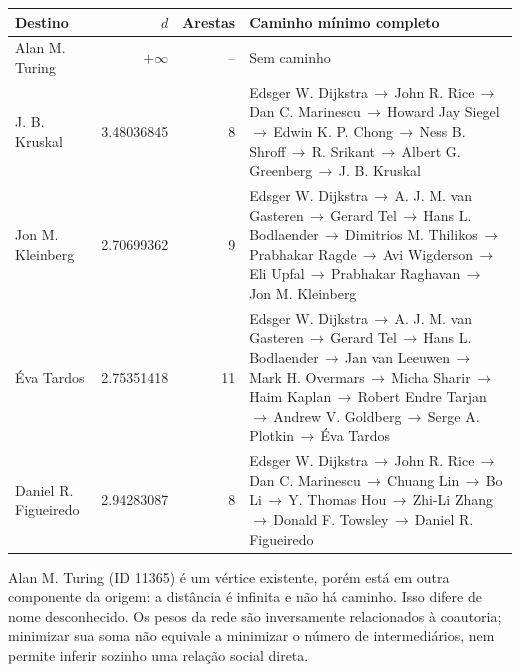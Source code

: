 \documentclass[a4paper,11pt]{article}
\newcommand{\rota}[1]{{\fontsize{8.5}{10.2}\selectfont #1}}
\begin{document}
\par\smallskip\noindent\begin{minipage}{\textwidth}\centering
\begingroup\fontsize{8.7}{10.4}\selectfont
\setlength{\tabcolsep}{4pt}
\begin{tabular}{>{\raggedright\arraybackslash}p{2.6cm} r r >{\raggedright\arraybackslash}p{10.2cm}}
\toprule
Destino & $d$ & Arestas & Caminho mínimo completo \\
\midrule
Alan M. Turing & $+\infty$ & -- & Sem caminho \\
J. B. Kruskal & \num{3.48036845} & 8 & \rota{Edsger W. Dijkstra\,$\to$\,\allowbreak John R. Rice\,$\to$\,\allowbreak Dan C. Marinescu\,$\to$\,\allowbreak Howard Jay Siegel\,$\to$\,\allowbreak Edwin K. P. Chong\,$\to$\,\allowbreak Ness B. Shroff\,$\to$\,\allowbreak R. Srikant\,$\to$\,\allowbreak Albert G. Greenberg\,$\to$\,\allowbreak J. B. Kruskal} \\
Jon M. Kleinberg & \num{2.70699362} & 9 & \rota{Edsger W. Dijkstra\,$\to$\,\allowbreak A. J. M. van Gasteren\,$\to$\,\allowbreak Gerard Tel\,$\to$\,\allowbreak Hans L. Bodlaender\,$\to$\,\allowbreak Dimitrios M. Thilikos\,$\to$\,\allowbreak Prabhakar Ragde\,$\to$\,\allowbreak Avi Wigderson\,$\to$\,\allowbreak Eli Upfal\,$\to$\,\allowbreak Prabhakar Raghavan\,$\to$\,\allowbreak Jon M. Kleinberg} \\
Éva Tardos & \num{2.75351418} & 11 & \rota{Edsger W. Dijkstra\,$\to$\,\allowbreak A. J. M. van Gasteren\,$\to$\,\allowbreak Gerard Tel\,$\to$\,\allowbreak Hans L. Bodlaender\,$\to$\,\allowbreak Jan van Leeuwen\,$\to$\,\allowbreak Mark H. Overmars\,$\to$\,\allowbreak Micha Sharir\,$\to$\,\allowbreak Haim Kaplan\,$\to$\,\allowbreak Robert Endre Tarjan\,$\to$\,\allowbreak Andrew V. Goldberg\,$\to$\,\allowbreak Serge A. Plotkin\,$\to$\,\allowbreak Éva Tardos} \\
Daniel R. Figueiredo & \num{2.94283087} & 8 & \rota{Edsger W. Dijkstra\,$\to$\,\allowbreak John R. Rice\,$\to$\,\allowbreak Dan C. Marinescu\,$\to$\,\allowbreak Chuang Lin\,$\to$\,\allowbreak Bo Li\,$\to$\,\allowbreak Y. Thomas Hou\,$\to$\,\allowbreak Zhi-Li Zhang\,$\to$\,\allowbreak Donald F. Towsley\,$\to$\,\allowbreak Daniel R. Figueiredo} \\
\bottomrule
\end{tabular}
\endgroup
{}
\end{minipage}\par\smallskip

Alan M. Turing (ID 11365) é um vértice existente, porém está em outra componente da origem: a distância é infinita e não há caminho. Isso difere de nome desconhecido. Os pesos da rede são inversamente relacionados à coautoria; minimizar sua soma não equivale a minimizar o número de intermediários, nem permite inferir sozinho uma relação social direta.
\newpage
\end{document}
